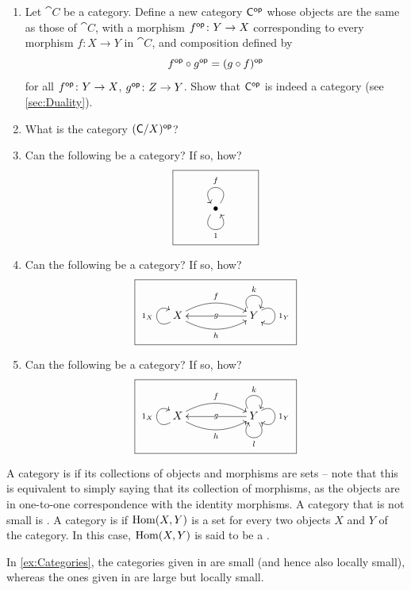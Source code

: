 \begin{Exercise}
\begin{enumerate}
\item Let $\cat C$ be a category. Define a new category $\mathsf{C}^\mathsf{op}$ whose objects are the same as those of $\cat C$, with a morphism $f^\mathsf{op} \colon Y \to X$ corresponding to every morphism $f \colon X \to Y$ in $\cat C$, and composition defined by
\begin{equation*}
f^\mathsf{op} \circ g^\mathsf{op} = (g \circ f)^\mathsf{op}
\end{equation*}
for all $f^\mathsf{op} \colon Y \to X$, $g^\mathsf{op} \colon Z \to Y$. Show that $\mathsf{C}^\mathsf{op}$ is indeed a category (see \cref{sec:Duality}).

\item What is the category $(\mathsf{C} / X)^\mathsf{op}$?

\item Can the following be a category? If so, how?
\begin{equation*}
\boxed{\xymatrix{
	& \bullet \ar @(ru, lu)_f \ar @(ld, rd)_1 &
}
}
\end{equation*}

\item Can the following be a category? If so, how?
\begin{equation*}
\boxed{\xymatrix{
	X \ar @(ld, lu)^{1_X} \ar  @/^1pc/[rr]^f  \ar  @/_1pc/[rr]_h && Y \ar @(ul, ur)^k \ar @(ur, dr)^{1_Y} \ar[ll]|-g
}}
\end{equation*}

\item Can the following be a category? If so, how?
\begin{equation*}
\boxed{\xymatrix{
	X \ar @(ld, lu)^{1_X} \ar  @/^1pc/[rr]^f  \ar  @/_1pc/[rr]_h && Y \ar @(ul, ur)^k \ar @(ur, dr)^{1_Y} \ar @(dr, dl)^l \ar[ll]|-g
}}
\end{equation*}
\end{enumerate}
\end{Exercise}

A category is  if its collections of objects and morphisms are sets -- note that this is equivalent to simply saying that its collection of morphisms, as the objects are in one-to-one correspondence with the identity morphisms. A category that is not small is . A category is  if $\operatorname{Hom}(X, Y)$ is a set for every two objects $X$ and $Y$ of the category. In this case, $\operatorname{Hom}(X, Y)$ is said to be a .

In \cref{ex:Categories}, the categories given in  are small (and hence also locally small), whereas the ones given in  are large but locally small.

